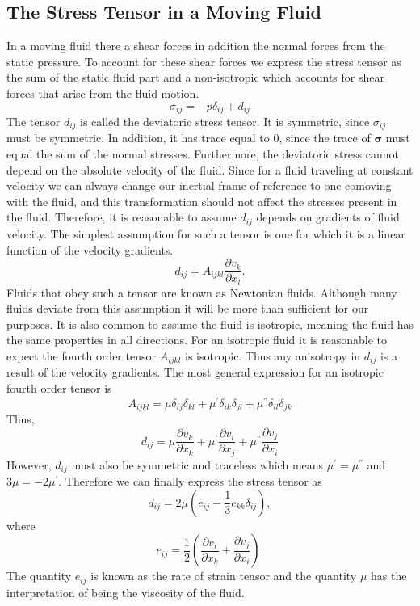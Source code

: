 \documentclass[12pt, letter]{report}
\begin{document}
\subsection{The Stress Tensor in a Moving Fluid}
In a moving fluid there a shear forces in addition the normal forces from the static pressure. To account for these shear forces we express the stress tensor as the sum of the static fluid part and a non-isotropic which accounts for shear forces that arise from the fluid motion.
\begin{equation} 
\label{eq:stress}
\sigma_{ij} = -p \delta_{ij} + d_{ij}
\end{equation}
The tensor $d_{ij}$ is called the deviatoric stress tensor. It is symmetric, since $\sigma_{ij}$ must be symmetric. In addition, it has trace equal to $0$, since the trace of $\boldsymbol{\sigma}$ must equal the sum of the normal stresses. Furthermore, the deviatoric stress cannot depend on the absolute velocity of the fluid. Since for a fluid traveling at constant velocity we can always change our inertial frame of reference to one comoving with the fluid, and this transformation should not affect the stresses present in the fluid. Therefore, it is reasonable to assume $d_{ij}$ depends on gradients of fluid velocity. The simplest assumption for such a tensor is one for which it is a linear function of the velocity gradients. 
\begin{equation} 
d_{ij} = A_{ijkl} \frac{\partial v_k}{\partial x_l}.
\end{equation}
Fluids that obey such a tensor are known as Newtonian fluids. Although many fluids deviate from this assumption it will be more than sufficient for our purposes. It is also common to assume the fluid is isotropic, meaning the fluid has the same properties in all directions. For an isotropic fluid it is reasonable to expect the fourth order tensor $A_{ijkl}$ is isotropic. Thus any anisotropy in $d_{ij}$ is a result of the velocity gradients. The most general expression for an isotropic fourth order tensor is 
\begin{equation}
A_{ijkl} = \mu \delta_{ij}\delta_{kl} + \mu^{'} \delta_{ik}\delta_{jl} + \mu^{''} \delta_{il}\delta_{jk}
\end{equation}
Thus,
\begin{equation}
d_{ij} = \mu \frac{\partial v_k}{\partial x_k} + \mu^{'} \frac{\partial v_i}{\partial x_j}+\mu^{''} \frac{\partial v_j}{\partial x_i} 
\end{equation}
However, $d_{ij}$ must also be symmetric and traceless which means $\mu^{'}=\mu^{''}$ and $3\mu = -2\mu^{'}$. Therefore we can finally express the stress tensor as
\begin{equation}
\label{eq:deviatoric}
d_{ij} = 2 \mu \left( e_{ij}- \frac{1}{3} e_{kk}\delta_{ij} \right),
\end{equation}
where
\begin{equation}
\label{eq:rate_of_strain}
e_{ij}=\frac{1}{2}\left( \frac{\partial v_i}{\partial x_k} + \frac{\partial v_j}{\partial x_i} \right).
\end{equation}
The quantity $e_{ij}$ is known as the rate of strain tensor and the quantity $\mu$ has the interpretation of being the viscosity of the fluid.
\end{document}
